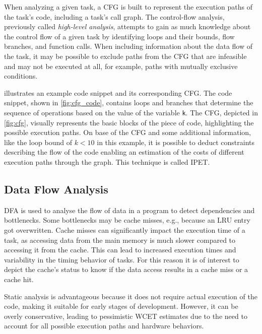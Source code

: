 When analyzing a given task, a \ac{CFG} is built to represent the execution paths of the task's code, including a task's call graph. The control-flow analysis, previously called \textit{high-level analysis}, attempts to gain as much knowledge about the control flow of a given task by identifying loops and their bounds, flow branches, and function calls. When including information about the data flow of the task, it may be possible to exclude paths from the \ac{CFG} that are infeasible and may not be executed at all, for example, paths with mutually exclusive conditions. 

 illustrates an example code snippet and its corresponding \ac{CFG}. 
The code snippet, shown in \cref{fig:cfg_code}, contains loops and branches that determine the sequence of operations based on the value of the variable \texttt{k}. 
The \ac{CFG}, depicted in \cref{fig:cfg}, visually represents the basic blocks of the piece of code, highlighting the possible execution paths.
On base of the \ac{CFG} and some additional information, like the loop bound of $k<10$ in this example, it is possible to deduct constraints describing the flow of the code enabling an estimation of the costs of different execution paths through the graph\cite{liCacheModelingRealtime1996,wilhelmWorstcaseExecutiontimeProblem2008}.
This technique is called \ac{IPET}\cite{wilhelmWorstcaseExecutiontimeProblem2008}.

\subsection{Data Flow Analysis}\label{sec:dfa}
\ac{DFA} is used to analyse the flow of data in a program to detect dependencies and bottlenecks.
Some bottlenecks may be cache misses, e.g., because an \ac{LRU} entry got overwritten. 
Cache misses can significantly impact the execution time of a task, as accessing data from the main memory is much slower compared to accessing it from the cache\cite{liCacheModelingRealtime1996}. 
This can lead to increased execution times and variability in the timing behavior of tasks.
For this reason it is of interest to depict the cache's status to know if the data access results in a cache miss or a cache hit.



Static analysis is advantageous because it does not require actual execution of the code, making it suitable for early stages of development. However, it can be overly conservative, leading to pessimistic WCET estimates due to the need to account for all possible execution paths and hardware behaviors.

